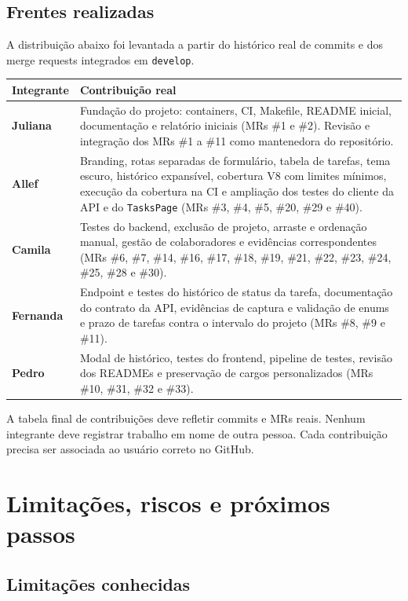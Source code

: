 \documentclass[12pt,a4paper,openany]{report}
\begin{document}
\section{Frentes realizadas}

A distribuição abaixo foi levantada a partir do histórico real de commits e dos merge requests integrados em \texttt{develop}.

\begin{tabularx}{\textwidth}{>{\bfseries}p{} X}
\toprule
Integrante & Contribuição real \\
\midrule
Juliana & Fundação do projeto: containers, CI, Makefile, README inicial, documentação e relatório iniciais (MRs \#1 e \#2). Revisão e integração dos MRs \#1 a \#11 como mantenedora do repositório. \\
Allef & Branding, rotas separadas de formulário, tabela de tarefas, tema escuro, histórico expansível, cobertura V8 com limites mínimos, execução da cobertura na CI e ampliação dos testes do cliente da API e do \texttt{TasksPage} (MRs \#3, \#4, \#5, \#20, \#29 e \#40). \\
Camila & Testes do backend, exclusão de projeto, arraste e ordenação manual, gestão de colaboradores e evidências correspondentes (MRs \#6, \#7, \#14, \#16, \#17, \#18, \#19, \#21, \#22, \#23, \#24, \#25, \#28 e \#30). \\
Fernanda & Endpoint e testes do histórico de status da tarefa, documentação do contrato da API, evidências de captura e validação de enums e prazo de tarefas contra o intervalo do projeto (MRs \#8, \#9 e \#11). \\
Pedro & Modal de histórico, testes do frontend, pipeline de testes, revisão dos READMEs e preservação de cargos personalizados (MRs \#10, \#31, \#32 e \#33). \\
\bottomrule
\end{tabularx}

\begin{statusbox}
A tabela final de contribuições deve refletir commits e MRs reais. Nenhum integrante deve registrar trabalho em nome de outra pessoa. Cada contribuição precisa ser associada ao usuário correto no GitHub.
\end{statusbox}

\chapter{Limitações, riscos e próximos passos}

\section{Limitações conhecidas}
\end{document}
